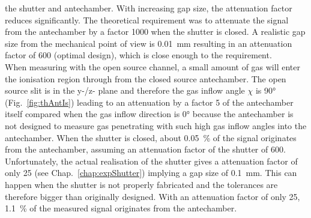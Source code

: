 	the shutter and antechamber. With increasing gap size, the attenuation factor reduces significantly. The theoretical requirement was to attenuate the signal from the antechamber by a factor 1000 when the shutter is closed. A realistic gap size from the mechanical point of view is 0.01~mm resulting in an attenuation factor of 600 (optimal design), which is close enough to the requirement.\\
	When measuring with the open source channel, a small amount of gas will enter the ionisation region through from the closed source antechamber. The open source slit is in the y-/z- plane and therefore the gas inflow angle $\chi$ is 90° (Fig.~\ref{fig:thAntIs}) leading to an attenuation by a factor 5 of the antechamber itself compared when the gas inflow direction is 0° because the antechamber is not designed to measure gas penetrating with such high gas inflow angles into the antechamber. When the shutter is closed, about 0.05~\% of the signal originates from the antechamber, assuming an attenuation factor of the shutter of 600. Unfortunately, the actual realisation of the shutter gives a attenuation factor of only 25 (see Chap.~\ref{chap:expShutter}) implying a gap size of 0.1~mm. This can happen when the shutter is not properly fabricated and the tolerances are therefore bigger than originally designed. With an attenuation factor of only 25, 1.1~\% of the measured signal originates from the antechamber.\\
	
	
